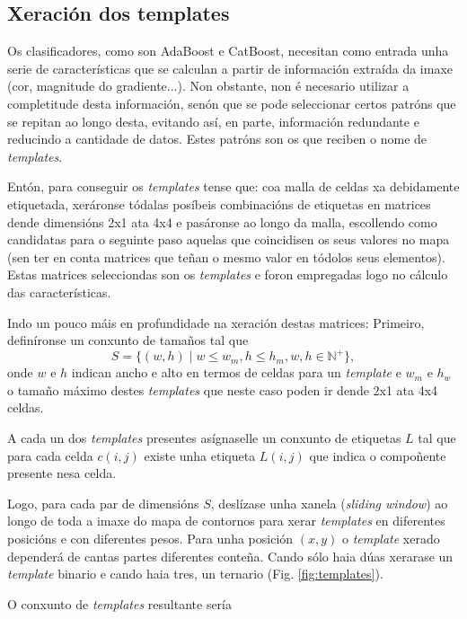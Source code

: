 \documentclass[galician]{./head/uvigo-tfg}
\begin{document}
        \subsection{Xeración dos templates}\label{templ}
        Os clasificadores, como son AdaBoost e CatBoost, necesitan como entrada unha serie de características que se calculan a partir de información extraída da imaxe (cor, magnitude do gradiente...). Non obstante, non é necesario utilizar a completitude desta información, senón que se pode seleccionar certos patróns que se repitan ao longo desta, evitando así, en parte, información redundante e reducindo a cantidade de datos. Estes patróns son os que reciben o nome de \textit{templates}.
        \par Entón, para conseguir os \textit{templates} tense que: coa malla de celdas xa debidamente etiquetada, xeráronse tódalas posíbeis combinacións de etiquetas en matrices dende dimensións 2x1 ata 4x4 e pasáronse ao longo da malla, escollendo como candidatas para o seguinte paso aquelas que coincidisen os seus valores no mapa (sen ter en conta matrices que teñan o mesmo valor en tódolos seus elementos). Estas matrices selecciondas son os \textit{templates} e foron empregadas logo no cálculo das características. 
        \par Indo un pouco máis en profundidade na xeración destas matrices: Primeiro, definíronse un conxunto de tamaños tal que
        \begin{equation}
            S = \{(w,h) \mid w \leq w_m, h \leq h_m,w,h \in \mathbb N^+\},
        \end{equation}
        onde $w$ e $h$ indican ancho e alto en termos de celdas para un \textit{template} e $w_m$ e $h_w$ o tamaño máximo destes \textit{templates} que neste caso poden ir dende 2x1 ata 4x4 celdas.
        \par A cada un dos \textit{templates} presentes asígnaselle un conxunto de etiquetas $L$ tal que para cada celda $c(i,j)$ existe unha etiqueta $L(i,j)$ que indica o compoñente presente nesa celda. 
        \par Logo, para cada par de dimensións $S$, deslízase unha xanela (\textit{sliding window}) ao longo de toda a imaxe do mapa de contornos para xerar \textit{templates} en diferentes posicións e con diferentes pesos. Para unha posición $(x,y)$ o \textit{template} xerado dependerá de cantas partes diferentes conteña. Cando sólo haia dúas xerarase un \textit{template} binario e cando haia tres, un ternario (Fig. \ref{fig:templates}).
        \par O conxunto de \textit{templates} resultante sería
\end{document}
